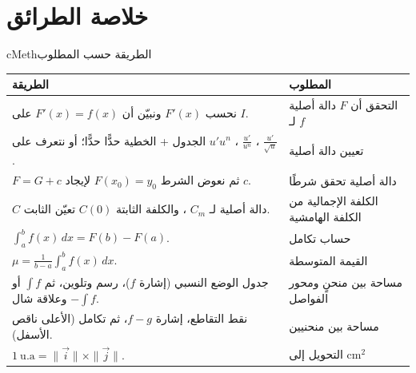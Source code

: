 \documentclass[12pt,a4paper]{article}
\newenvironment{BOX}[2]{\begin{otherlanguage}{english}\begin{arbox}{#1}{#2}}{\end{arbox}\end{otherlanguage}}
\let\origNeedspace\Needspace
\renewcommand{\Needspace}[1]{\origNeedspace{14\baselineskip}}
\renewcommand{\arraystretch}{1.25}
\begin{document}
\origNeedspace{22\baselineskip}\section{خلاصة الطرائق}
\begin{BOX}{cMeth}{الطريقة حسب المطلوب}
\begin{center}
\renewcommand{\arraystretch}{1.35}
\begin{tabular}{|p{}|p{}|}\hline
\rowcolor{cSec!12} \textbf{الطريقة} & \textbf{المطلوب}\\\hline
نحسب $F'(x)$ ونبيّن أن $F'(x)=f(x)$ على $I$. & التحقق أن $F$ دالة أصلية لـ $f$\\\hline
الجدول + الخطية حدًّا حدًّا؛ أو نتعرف على $u'u^n$ ، $\frac{u'}{u^n}$ ، $\frac{u'}{\sqrt u}$. & تعيين دالة أصلية\\\hline
$F=G+c$ ثم نعوض الشرط $F(x_0)=y_0$ لإيجاد $c$. & دالة أصلية تحقق شرطًا\\\hline
$C$ دالة أصلية لـ $C_m$ ، والكلفة الثابتة $C(0)$ تعيّن الثابت. & الكلفة الإجمالية من الكلفة الهامشية\\\hline
$\int_a^bf(x)\,dx=F(b)-F(a)$. & حساب تكامل\\\hline
$\mu=\frac{1}{b-a}\int_a^bf(x)\,dx$. & القيمة المتوسطة\\\hline
جدول الوضع النسبي (إشارة $f$)، رسم وتلوين، ثم $\int f$ أو $-\int f$ وعلاقة شال. & مساحة بين منحنٍ ومحور الفواصل\\\hline
نقط التقاطع، إشارة $f-g$، ثم تكامل (الأعلى ناقص الأسفل). & مساحة بين منحنيين\\\hline
$1\ \text{u.a}=\|\vec i\|\times\|\vec j\|$. & التحويل إلى $\text{cm}^2$\\\hline
\end{tabular}
\end{center}
\end{BOX}
\end{document}
